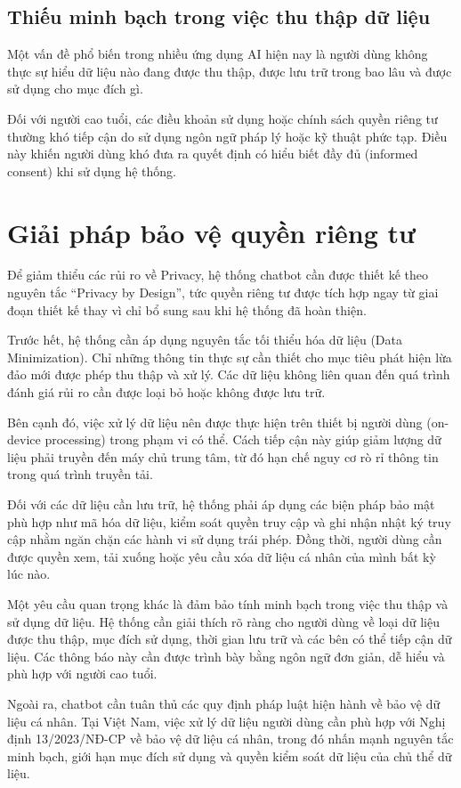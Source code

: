 \subsection{Thiếu minh bạch trong việc thu thập dữ liệu}
Một vấn đề phổ biến trong nhiều ứng dụng AI hiện nay là người dùng không thực sự hiểu dữ liệu nào đang được thu thập, được lưu trữ trong bao lâu và được sử dụng cho mục đích gì.

Đối với người cao tuổi, các điều khoản sử dụng hoặc chính sách quyền riêng tư thường khó tiếp cận do sử dụng ngôn ngữ pháp lý hoặc kỹ thuật phức tạp. Điều này khiến người dùng khó đưa ra quyết định có hiểu biết đầy đủ (informed consent) khi sử dụng hệ thống.

\section{Giải pháp bảo vệ quyền riêng tư}
Để giảm thiểu các rủi ro về Privacy, hệ thống chatbot cần được thiết kế theo nguyên tắc “Privacy by Design”, tức quyền riêng tư được tích hợp ngay từ giai đoạn thiết kế thay vì chỉ bổ sung sau khi hệ thống đã hoàn thiện.

Trước hết, hệ thống cần áp dụng nguyên tắc tối thiểu hóa dữ liệu (Data Minimization). Chỉ những thông tin thực sự cần thiết cho mục tiêu phát hiện lừa đảo mới được phép thu thập và xử lý. Các dữ liệu không liên quan đến quá trình đánh giá rủi ro cần được loại bỏ hoặc không được lưu trữ.

Bên cạnh đó, việc xử lý dữ liệu nên được thực hiện trên thiết bị người dùng (on-device processing) trong phạm vi có thể. Cách tiếp cận này giúp giảm lượng dữ liệu phải truyền đến máy chủ trung tâm, từ đó hạn chế nguy cơ rò rỉ thông tin trong quá trình truyền tải.

Đối với các dữ liệu cần lưu trữ, hệ thống phải áp dụng các biện pháp bảo mật phù hợp như mã hóa dữ liệu, kiểm soát quyền truy cập và ghi nhận nhật ký truy cập nhằm ngăn chặn các hành vi sử dụng trái phép. Đồng thời, người dùng cần được quyền xem, tải xuống hoặc yêu cầu xóa dữ liệu cá nhân của mình bất kỳ lúc nào.

Một yêu cầu quan trọng khác là đảm bảo tính minh bạch trong việc thu thập và sử dụng dữ liệu. Hệ thống cần giải thích rõ ràng cho người dùng về loại dữ liệu được thu thập, mục đích sử dụng, thời gian lưu trữ và các bên có thể tiếp cận dữ liệu. Các thông báo này cần được trình bày bằng ngôn ngữ đơn giản, dễ hiểu và phù hợp với người cao tuổi.

Ngoài ra, chatbot cần tuân thủ các quy định pháp luật hiện hành về bảo vệ dữ liệu cá nhân. Tại Việt Nam, việc xử lý dữ liệu người dùng cần phù hợp với Nghị định 13/2023/NĐ-CP về bảo vệ dữ liệu cá nhân, trong đó nhấn mạnh nguyên tắc minh bạch, giới hạn mục đích sử dụng và quyền kiểm soát dữ liệu của chủ thể dữ liệu.

